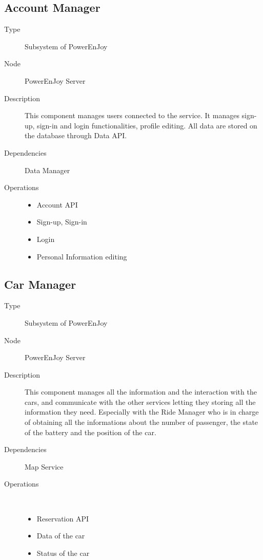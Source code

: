 \subsection{Account Manager}
\begin{description}
	\item[Type] Subsystem of PowerEnJoy
	\item[Node] PowerEnJoy Server
	\item[Description] This component manages users connected to the service. It manages sign-up, sign-in and login functionalities, profile editing. All data are stored on the database through Data API.
	\item[Dependencies] Data Manager
	\item[Operations] 
		\begin{itemize}
			\item Account API
			\item Sign-up, Sign-in
			\item Login  
			\item Personal Information editing 
	\end{itemize}
\end{description}

\subsection{Car Manager}
\begin{description}
	\item[Type] Subsystem of PowerEnJoy
	\item[Node] PowerEnJoy Server
	\item[Description] This component manages all the information and the interaction with the cars, and communicate with the other services letting they storing all the information they need. Especially  with the Ride Manager who is in charge of obtaining all the informations about the number of passenger, the state of the battery and the position of the car.
	\item[Dependencies] Map Service
	\item[Operations] \ \\
		\begin{itemize}
			\item Reservation API
			\item Data of the car
			\item Status of the car   
	\end{itemize}
\end{description}

